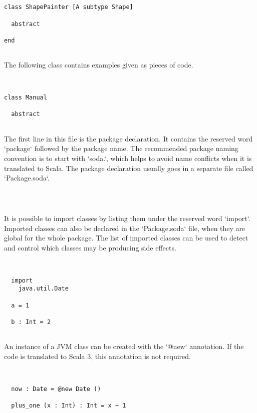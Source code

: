 \documentclass[12pt,a4paper]{article}
\begin{document}
\begin{lstlisting}


class ShapePainter [A subtype Shape]

  abstract

end


\end{lstlisting}

The following class contains examples given as pieces of code.


\begin{lstlisting}


class Manual

  abstract


\end{lstlisting}

  The first line in this file is the package declaration. It contains the reserved word
   `package` followed by the package name. The recommended package naming convention is to
   start with `soda.`, which helps to avoid name conflicts when it is translated to Scala.
   The package declaration usually goes in a separate file called `Package.soda`.


\begin{lstlisting}



\end{lstlisting}

  It is possible to import classes by listing them under the reserved word `import`.
   Imported classes can also be declared in the `Package.soda` file, when they are global
   for the whole package. The list of imported classes can be used to detect and control which
   classes may be producing side effects.


\begin{lstlisting}


  import
    java.util.Date

  a = 1

  b : Int = 2


\end{lstlisting}

  An instance of a JVM class can be created with the `@new` annotation. If the code is
   translated to Scala 3, this annotation is not required.


\begin{lstlisting}


  now : Date = @new Date ()

  plus_one (x : Int) : Int = x + 1


\end{lstlisting}
\end{document}
